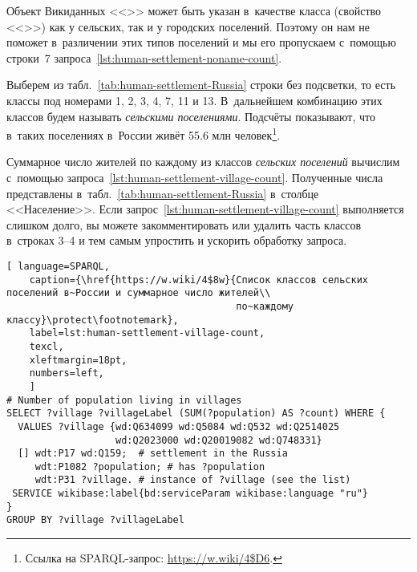 Объект Викиданных <<>> 
может быть указан в~качестве класса (свойство <<>>) 
как у сельских, так и у городских поселений. 
Поэтому он нам не поможет в~различении этих типов поселений 
и мы его пропускаем с~помощью строки~7 запроса~\ref{lst:human-settlement-noname-count}.



\newpage
Выберем из табл.~\ref{tab:human-settlement-Russia} строки без подсветки, 
то есть классы под номерами 1, 2, 3, 4, 7, 11 и 13. 
В~дальнейшем комбинацию этих классов будем называть \emph{сельскими поселениями}. 
Подсчёты показывают, что в~таких поселениях в~России живёт 
\num{55,6} млн человек\footnote{%
Ссылка на SPARQL-запрос: \url{https://w.wiki/4$D6}.%
}. 

Суммарное число жителей по каждому из классов \emph{сельских поселений} 
вычислим с~помощью запроса~\ref{lst:human-settlement-village-count}. 
Полученные числа представлены в~табл.~\ref{tab:human-settlement-Russia} в~столбце <<Население>>. 
Если запрос~\ref{lst:human-settlement-village-count} выполняется слишком долго, 
вы можете закомментировать или удалить часть классов в~строках 3--4 
и тем самым упростить и ускорить обработку запроса. 

\begin{lstlisting}[ language=SPARQL, 
    caption={\href{https://w.wiki/4$8w}{Список классов сельских поселений в~России и суммарное число жителей\\
                                        по~каждому классу}\protect\footnotemark},
    label=lst:human-settlement-village-count,
    texcl,
    xleftmargin=18pt, 
    numbers=left,
    ]
# Number of population living in villages
SELECT ?village ?villageLabel (SUM(?population) AS ?count) WHERE {  
  VALUES ?village {wd:Q634099 wd:Q5084 wd:Q532 wd:Q2514025 
                   wd:Q2023000 wd:Q20019082 wd:Q748331}
  [] wdt:P17 wd:Q159;  # settlement in the Russia
     wdt:P1082 ?population; # has ?population
     wdt:P31 ?village. # instance of ?village (see the list)
 SERVICE wikibase:label{bd:serviceParam wikibase:language "ru"}
}
GROUP BY ?village ?villageLabel
\end{lstlisting}%



